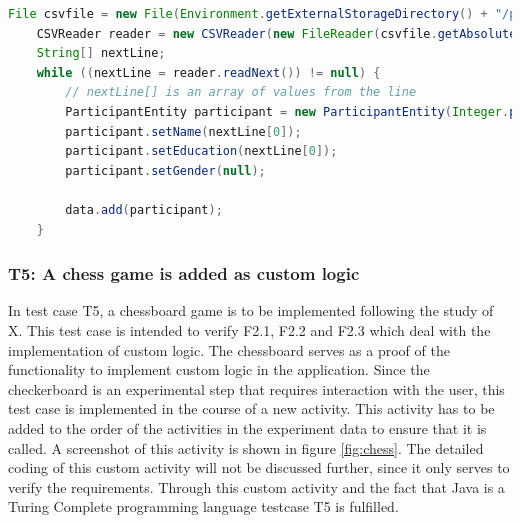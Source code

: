 \vspace{1cm}

\begin{lstlisting}[language=java,label=t3b,lineskip={0pt}, caption=Collect time needed to conduct experiment (b), basicstyle=\scriptsize, captionpos=b]
    File csvfile = new File(Environment.getExternalStorageDirectory() + "/participantData.csv");
    CSVReader reader = new CSVReader(new FileReader(csvfile.getAbsolutePath()));
    String[] nextLine;
    while ((nextLine = reader.readNext()) != null) {
        // nextLine[] is an array of values from the line
        ParticipantEntity participant = new ParticipantEntity(Integer.parseInt(nextLine[0]));
        participant.setName(nextLine[0]);
        participant.setEducation(nextLine[0]);
        participant.setGender(null);
    
        data.add(participant);
    }
\end{lstlisting}

\newpage\subsubsection*{T5: A chess game is added as custom logic}

In test case T5, a chessboard game is to be implemented following the study of X. This test case is intended to verify F2.1, F2.2 and F2.3 which deal with the implementation of custom logic. The chessboard serves as a proof of the functionality to implement custom logic in the application. Since the checkerboard is an experimental step that requires interaction with the user, this test case is implemented in the course of a new activity. This activity has to be added to the order of the activities in the experiment data to ensure that it is called. A screenshot of this activity is shown in figure \ref{fig:chess}. The detailed coding of this custom activity will not be discussed further, since it only serves to verify the requirements. Through this custom activity and the fact that Java is a Turing Complete programming language testcase T5 is fulfilled.

\vspace{1.5cm}

